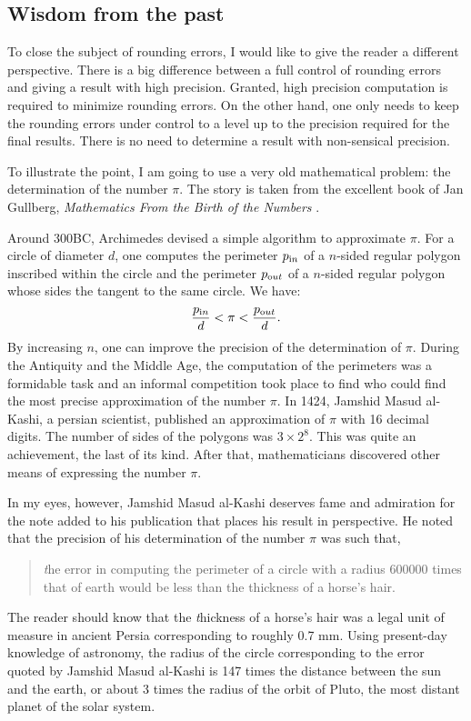 \subsection{Wisdom from the past}
To close the subject of rounding errors, I would like to give the
reader a different perspective. There is a big difference between
a full control of rounding errors and giving a result with high
precision. Granted, high precision computation is required to
minimize rounding errors. On the other hand, one only needs to
keep the rounding errors under control to a level up to the
precision required for the final results. There is no need to
determine a result with non-sensical precision.

To illustrate the point, I am going to use a very old mathematical
problem: the determination of the number $\pi$. The story is taken
from the excellent book of Jan Gullberg, {\em Mathematics From the
Birth of the Numbers} \cite{Gullberg}.

Around 300BC, Archimedes devised a simple algorithm to approximate
$\pi$. For a circle of diameter $d$, one computes the perimeter
$p_{\mathop{\textrm in}}$ of a $n$-sided regular polygon inscribed
within the circle and the perimeter $p_{\mathop{\textrm out}}$ of a
$n$-sided regular polygon whose sides the tangent to the same
circle. We have:
\begin{equation}
{\displaystyle p_{\mathop{\textrm in}} \over\displaystyle d
}<\pi<{\displaystyle p_{\mathop{\textrm out}} \over\displaystyle d}.
\end{equation}
By increasing $n$, one can improve the precision of the
determination of $\pi$. During the Antiquity and the Middle Age,
the computation of the perimeters was a formidable task and an
informal competition took place to find who could find the most
precise approximation of the number $\pi$. In 1424, Jamshid Masud
al-Kashi, a persian scientist, published an approximation of $\pi$
with 16 decimal digits. The number of sides of the polygons was
$3\times 2^8$. This was quite an achievement, the last of its
kind. After that, mathematicians discovered other means of
expressing the number $\pi$.

In my eyes, however, Jamshid Masud al-Kashi deserves fame and
admiration for the note added to his publication that places his
result in perspective. He noted that the precision of his
determination of the number $\pi$ was such that,
\begin{quote}{\textit the error
in computing the perimeter of a circle with a radius 600000 times
that of earth would be less than the thickness of a horse's hair}.
\end{quote}
The reader should know that the {\textit thickness of a horse's
hair\/} was a legal unit of measure in ancient Persia
corresponding to roughly 0.7 mm. Using present-day knowledge of
astronomy, the radius of the circle corresponding to the error
quoted by Jamshid Masud al-Kashi is 147 times the distance between
the sun and the earth, or about 3 times the radius of the orbit of
Pluto, the most distant planet of the solar system.

